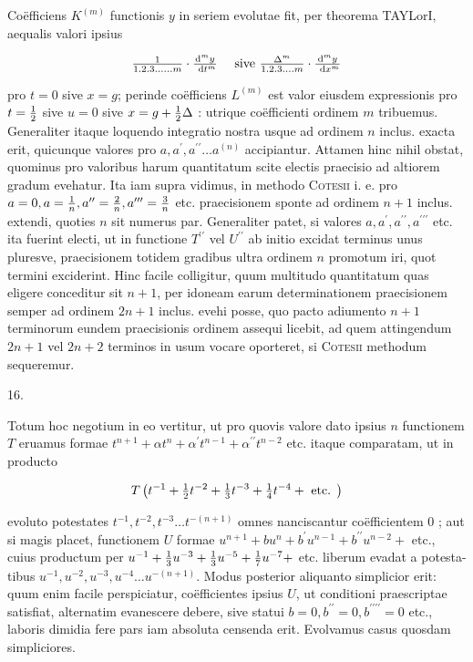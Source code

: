 \documentclass[twoside,12pt, showframe]{memoir}
\let\oldfrac\frac
\def\frac#1#2{\mathchoice{\tfrac{#1}{#2}}{\oldfrac{#1}{#2}}{\genfrac{}{}{}{2}{#1}{#2\mathstrut}}{\genfrac{}{}{}{3}{#1}{#2\mathstrut}}}
\begin{document}
Coëfficiens \(K^{(m)}\) functionis \(y\) in seriem evolutae fit, per theorema TAYLorI, aequalis valori ipsius

\[
\frac{1}{1.2 .3 \ldots \ldots m} \cdot \frac{\mathrm{d}^{m} y}{\mathrm{~d} t^{m}} \quad \text { sive } \frac{\Delta^{m}}{1.2 .3 \ldots . m} \cdot \frac{\mathrm{d}^{m} y}{\mathrm{~d} x^{m}}
\]

pro \(t=0\) sive \(x=g\); perinde coëfficiens \(L^{(m)}\) est valor eiusdem expressionis pro \(t=\frac{1}{2}\) sive \(u=0\) sive \(x=g+\frac{1}{2} \Delta\) : utrique coëfficienti ordinem \(m\) tribuemus. Generaliter itaque loquendo integratio nostra usque ad ordinem \(n\) inclus. exacta erit, quicunque valores pro \(a, a^{\prime}, a^{\prime \prime} \ldots a^{(n)}\) accipiantur. Attamen hinc nihil obstat, quominus pro valoribus harum quantitatum scite electis praecisio ad altiorem gradum evehatur. Ita iam supra vidimus, in methodo \textsc{Cotesii} i. e. pro \(a=0, a=\frac{1}{n}, a^{\prime \prime}=\frac{2}{n}, a^{\prime \prime \prime}=\frac{3}{n}\) etc. praecisionem sponte ad ordinem \(n+1\) inclus. extendi, quoties \(n\) sit numerus par. Generaliter patet, si valores \(a, a^{\prime}, a^{\prime \prime}, a^{\prime \prime \prime}\) etc. ita fuerint electi, ut in functione \(T^{\prime \prime}\) vel \(U^{\prime \prime}\) ab initio excidat terminus unus pluresve, praecisionem totidem gradibus ultra ordinem \(n\) promotum iri, quot termini exciderint. Hinc facile colligitur, quum multitudo quantitatum quas eligere conceditur sit \(n+1\), per idoneam earum determinationem praecisionem semper ad ordinem \(2 n+1\) inclus. evehi posse, quo pacto adiumento \(n+1\) terminorum eundem praecisionis ordinem assequi licebit, ad quem attingendum \(2 n+1\) vel \(2 n+2\) terminos in usum vocare oporteret, si \textsc{Cotesii} methodum sequeremur.

16.

Totum hoc negotium in eo vertitur, ut pro quovis valore dato ipsius \(n\) functionem \(T\) eruamus formae \(t^{n+1}+\alpha t^{n}+\alpha^{\prime} t^{n-1}+\alpha^{\prime \prime} t^{n-2}\) etc. itaque comparatam, ut in producto

\[
T\left(t^{-1}+\frac{1}{2} t^{-2}+\frac{1}{3} t^{-3}+\frac{1}{4} t^{-4}+\text { etc. }\right)
\]

evoluto potestates \(t^{-1}, t^{-2}, t^{-3} \ldots t^{-(n+1)}\) omnes nanciscantur coëfficientem 0 ; aut si magis placet, functionem \(U\) formae \(u^{n+1}+b u^{n}+b^{\prime} u^{n-1}+b^{\prime \prime} u^{n-2}+\) etc., cuius productum per \(u^{-1}+\frac{1}{3} u^{-3}+\frac{1}{3} u^{-5}+\frac{1}{7} u^{-7}+\) etc. liberum evadat a potesta-
tibus \(u^{-1}, u^{-2}, u^{-3}, u^{-4} \ldots u^{-(n+1)}\). Modus posterior aliquanto simplicior erit: quum enim facile perspiciatur, coëfficientes ipsius \(U\), ut conditioni praescriptae satisfiat, alternatim evanescere debere, sive statui \(b=0, b^{\prime \prime}=0, b^{\prime \prime \prime \prime}=0\) etc., laboris dimidia fere pars iam absoluta censenda erit. Evolvamus casus quosdam simpliciores.
\end{document}
